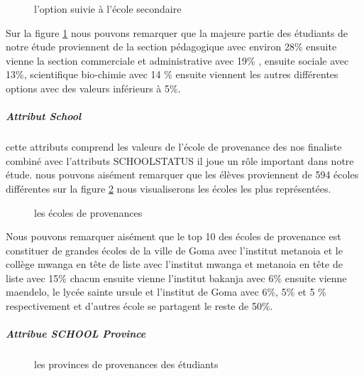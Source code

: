 \begin{figure}[!htbp]
	\centering
	\caption{l'option suivie à l'école secondaire }
	\label{fig:Option_right}
\end{figure}
Sur la figure \ref{fig:Option_right} nous pouvons remarquer que la majeure partie des
étudiants de notre étude proviennent de la section pédagogique avec
environ 28\% ensuite vienne la section commerciale et administrative
avec 19\% , ensuite  sociale avec 13\%, scientifique bio-chimie avec 14
\% ensuite viennent les  autres différentes options avec des valeurs
inférieurs à 5\%.
\subparagraph{Attribut School}\label{attribut-school}
cette attributs comprend les valeurs de l'école de provenance des nos
finaliste combiné avec l'attributs SCHOOLSTATUS  il joue un rôle
important dans notre étude.
nous pouvons aisément remarquer que les élèves proviennent de 594 écoles
différentes sur la figure \ref{fig:SCHOOL} nous visualiserons les écoles
les plus représentées.
\begin{figure}[!htbp]
	\centering
	\caption{les écoles de provenances  }
	\label{fig:SCHOOL}
\end{figure}
Nous pouvons remarquer aisément que le top 10 des écoles de provenance
est constituer de grandes écoles de la ville de Goma avec l'institut
metanoia et le collège mwanga en tête de liste avec l'institut mwanga et
metanoia en tête de liste avec 15\% chacun ensuite vienne l'institut
bakanja avec 6\% ensuite vienne maendelo, le lycée sainte ursule et
l'institut de Goma avec 6\%, 5\% et 5 \% respectivement et d'autres
école se partagent le reste de 50\%.
\subparagraph{Attribue SCHOOL Province}
\begin{figure}[!htbp]
	\centering
	\caption{les provinces de provenances des étudiants   }
	\label{fig:SCHOOLProvince}
\end{figure}
